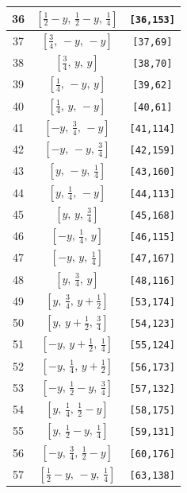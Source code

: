 \documentclass[fleqn,8pt]{jsarticle}
\begin{document}
\begin{longtable}{ccc}
36 & $\left[ \frac{1}{2} - y,\, \frac{1}{2} - y,\, \frac{1}{4} \right]$ & {\tt [36,153]} \\ \hline
37 & $\left[ \frac{3}{4},\, - y,\, - y \right]$ & {\tt [37,69]} \\ \hline
38 & $\left[ \frac{3}{4},\, y,\, y \right]$ & {\tt [38,70]} \\ \hline
39 & $\left[ \frac{1}{4},\, - y,\, y \right]$ & {\tt [39,62]} \\ \hline
40 & $\left[ \frac{1}{4},\, y,\, - y \right]$ & {\tt [40,61]} \\ \hline
41 & $\left[ - y,\, \frac{3}{4},\, - y \right]$ & {\tt [41,114]} \\ \hline
42 & $\left[ - y,\, - y,\, \frac{3}{4} \right]$ & {\tt [42,159]} \\ \hline
43 & $\left[ y,\, - y,\, \frac{1}{4} \right]$ & {\tt [43,160]} \\ \hline
44 & $\left[ y,\, \frac{1}{4},\, - y \right]$ & {\tt [44,113]} \\ \hline
45 & $\left[ y,\, y,\, \frac{3}{4} \right]$ & {\tt [45,168]} \\ \hline
46 & $\left[ - y,\, \frac{1}{4},\, y \right]$ & {\tt [46,115]} \\ \hline
47 & $\left[ - y,\, y,\, \frac{1}{4} \right]$ & {\tt [47,167]} \\ \hline
48 & $\left[ y,\, \frac{3}{4},\, y \right]$ & {\tt [48,116]} \\ \hline
49 & $\left[ y,\, \frac{3}{4},\, y + \frac{1}{2} \right]$ & {\tt [53,174]} \\ \hline
50 & $\left[ y,\, y + \frac{1}{2},\, \frac{3}{4} \right]$ & {\tt [54,123]} \\ \hline
51 & $\left[ - y,\, y + \frac{1}{2},\, \frac{1}{4} \right]$ & {\tt [55,124]} \\ \hline
52 & $\left[ - y,\, \frac{1}{4},\, y + \frac{1}{2} \right]$ & {\tt [56,173]} \\ \hline
53 & $\left[ - y,\, \frac{1}{2} - y,\, \frac{3}{4} \right]$ & {\tt [57,132]} \\ \hline
54 & $\left[ y,\, \frac{1}{4},\, \frac{1}{2} - y \right]$ & {\tt [58,175]} \\ \hline
55 & $\left[ y,\, \frac{1}{2} - y,\, \frac{1}{4} \right]$ & {\tt [59,131]} \\ \hline
56 & $\left[ - y,\, \frac{3}{4},\, \frac{1}{2} - y \right]$ & {\tt [60,176]} \\ \hline
57 & $\left[ \frac{1}{2} - y,\, - y,\, \frac{1}{4} \right]$ & {\tt [63,138]} \\ \hline

\end{longtable}
\end{document}
